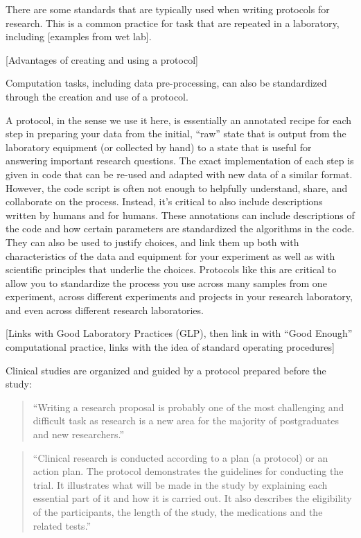 \documentclass[]{tufte-book}
\begin{document}
There are some standards that are typically used when writing protocols for
research. This is a common practice for task that are repeated in a laboratory,
including {[}examples from wet lab{]}.

{[}Advantages of creating and using a protocol{]}

Computation tasks, including data pre-processing, can also be standardized
through the creation and use of a protocol.

A protocol, in the sense we use it here, is essentially an annotated
recipe for each step in preparing your data from the initial, ``raw'' state
that is output from the laboratory equipment (or collected by hand) to a
state that is useful for answering important research questions. The
exact implementation of each step is given in code that can be re-used and
adapted with new data of a similar format. However, the code script is
often not enough to helpfully understand, share, and collaborate on the
process. Instead, it's critical to also include descriptions written
by humans and for humans. These annotations can include descriptions of the
code and how certain parameters are standardized the algorithms in the code.
They can also be used to justify choices, and link them up both with
characteristics of the data and equipment for your experiment as well as
with scientific principles that underlie the choices. Protocols like this
are critical to allow you to standardize the process you use across many
samples from one experiment, across different experiments and projects in
your research laboratory, and even across different research laboratories.

{[}Links with Good Laboratory Practices (GLP), then link in with
``Good Enough'' computational practice, links with the idea of
standard operating procedures{]}

Clinical studies are organized and guided by a protocol prepared before the
study:

\begin{quote}
``Writing a research proposal is probably one of the most challenging and
difficult task as research is a new area for the majority of postgraduates and
new researchers.'' \citep{al2016protocol}
\end{quote}

\begin{quote}
``Clinical research is conducted according to a plan (a protocol) or an action plan. The protocol demonstrates the guidelines for conducting the trial. It illustrates what will be made in the study by explaining each essential part of it and how it is carried out. It also describes the eligibility of the participants, the length of the study, the medications and the related tests.'' \citep{al2016protocol}
\end{quote}
\end{document}
